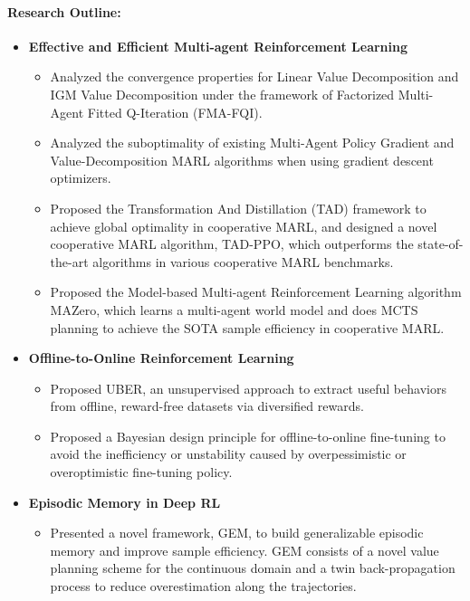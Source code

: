 \documentclass{resume}
\begin{document}
\vspace{2em}



\paragraph{Research Outline:}

\begin{itemize}
  \item \textbf{Effective and Efficient Multi-agent Reinforcement Learning} 

  \begin{itemize}
    \item Analyzed the convergence properties for Linear Value Decomposition and IGM Value Decomposition under the framework of Factorized Multi-Agent Fitted Q-Iteration (FMA-FQI).
    \item Analyzed the suboptimality of existing Multi-Agent Policy Gradient and Value-Decomposition MARL algorithms when using gradient descent optimizers.
    \item Proposed the Transformation And Distillation (TAD) framework to achieve global optimality in cooperative MARL, and designed a novel cooperative MARL algorithm, TAD-PPO, which outperforms the state-of-the-art algorithms in various cooperative MARL benchmarks.
    \item Proposed the Model-based Multi-agent Reinforcement Learning algorithm MAZero, which learns a multi-agent world model and does MCTS planning to achieve the SOTA sample efficiency in cooperative MARL.
  \end{itemize}

  \item \textbf{Offline-to-Online Reinforcement Learning}

  \begin{itemize}
    \item Proposed UBER, an unsupervised approach to extract useful behaviors from offline, reward-free datasets via diversified rewards.
    \item Proposed a Bayesian design principle for offline-to-online fine-tuning to avoid the inefficiency or unstability caused by overpessimistic or overoptimistic fine-tuning policy.
  \end{itemize}
  \item \textbf{Episodic Memory in Deep RL}

  \begin{itemize}
    \item Presented a novel framework, GEM, to build generalizable episodic memory and improve sample efficiency. GEM consists of a novel value planning scheme for the continuous domain and a twin back-propagation process to reduce overestimation along the trajectories.
  \end{itemize}
\end{itemize}
\end{document}
